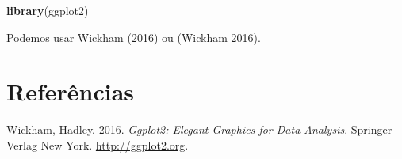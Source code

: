 \documentclass[]{article}
\newenvironment{Shaded}{\begin{snugshade}}{\end{snugshade}}
\newcommand{\KeywordTok}[1]{\textcolor[rgb]{0.26,0.66,0.93}{\textbf{#1}}}
\newcommand{\NormalTok}[1]{\textcolor[rgb]{0.74,0.68,0.62}{#1}}
\begin{document}
\begin{Shaded}
\begin{Highlighting}[]
\KeywordTok{library}\NormalTok{(ggplot2)}
\end{Highlighting}
\end{Shaded}

Podemos usar Wickham (2016) ou (Wickham 2016).

\hypertarget{referuxeancias}{%
\section*{Referências}\label{referuxeancias}}

\hypertarget{refs}{}
\leavevmode\hypertarget{ref-ggplot2}{}%
Wickham, Hadley. 2016. \emph{Ggplot2: Elegant Graphics for Data
Analysis}. Springer-Verlag New York. \url{http://ggplot2.org}.
\end{document}
